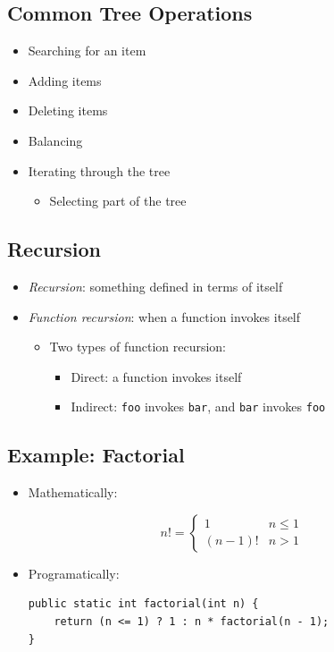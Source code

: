 \documentclass[10pt]{article}
\begin{document}
\subsection*{Common Tree Operations}
\begin{itemize}
    \item Searching for an item
    \item Adding items
    \item Deleting items
    \item Balancing
    \item Iterating through the tree
    \begin{itemize}
        \item Selecting part of the tree
    \end{itemize}
\end{itemize}

\subsection*{Recursion}
\begin{itemize}
    \item \textit{Recursion}: something defined in terms of itself
    \item \textit{Function recursion}: when a function invokes itself
    \begin{itemize}
        \item Two types of function recursion:
        \begin{itemize}
            \item Direct: a function invokes itself
            \item Indirect: \texttt{foo} invokes \texttt{bar}, and \texttt{bar} invokes \texttt{foo}
        \end{itemize}
    \end{itemize}
\end{itemize}

\subsection*{Example: Factorial}
\begin{itemize}
    \item Mathematically:
\end{itemize}
$$
n! = \begin{cases}
    1 & n \leq 1 \\
    (n-1)! & n > 1
\end{cases}
$$
\begin{itemize}
\item Programatically:
\begin{verbatim}
public static int factorial(int n) {
    return (n <= 1) ? 1 : n * factorial(n - 1);
}
\end{verbatim}
\end{itemize}
\end{document}
